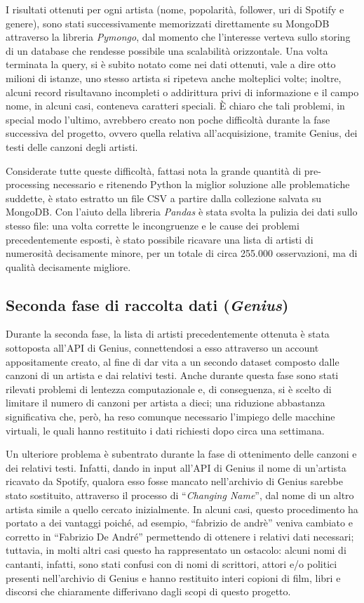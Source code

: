 \documentclass[fleqn,10pt]{SelfArx} %
\begin{document}
I risultati ottenuti per ogni artista (nome, popolarità, follower, uri di Spotify e genere), sono stati successivamente memorizzati direttamente su MongoDB attraverso la libreria \textit{Pymongo}, dal momento che l’interesse verteva sullo storing di un database che rendesse possibile una scalabilità orizzontale. Una volta terminata la query, si è subito notato come nei dati ottenuti, vale a dire otto milioni di istanze, uno stesso artista si ripeteva anche molteplici volte; inoltre, alcuni record risultavano incompleti o addirittura privi di informazione e il campo nome, in alcuni casi, conteneva caratteri speciali. È chiaro che tali problemi, in special modo l’ultimo, avrebbero creato non poche difficoltà durante la fase successiva del progetto, ovvero quella relativa all’acquisizione, tramite Genius, dei testi delle canzoni degli artisti.

Considerate tutte queste difficoltà, fattasi nota la grande quantità di pre-processing necessario e ritenendo Python la miglior soluzione alle problematiche suddette, è stato estratto un file CSV a partire dalla collezione salvata su MongoDB.
Con l’aiuto della libreria \textit{Pandas} è stata svolta la pulizia dei dati sullo stesso file: una volta corrette le incongruenze e le cause dei problemi precedentemente esposti, è stato possibile ricavare una lista di artisti di numerosità decisamente minore, per un totale di circa 255.000 osservazioni, ma di qualità decisamente migliore.

\subsection{Seconda fase di raccolta dati (\textit{Genius})}

Durante la seconda fase, la lista di artisti precedentemente ottenuta è stata sottoposta all’API di Genius, connettendosi a esso attraverso un account appositamente creato, al fine di dar vita a un secondo dataset composto dalle canzoni di un artista e dai relativi testi.
Anche durante questa fase sono stati rilevati problemi di lentezza computazionale e, di conseguenza, si è scelto di limitare il numero di canzoni per artista a dieci; una riduzione abbastanza significativa che, però, ha reso comunque necessario l’impiego delle macchine virtuali, le quali hanno restituito i dati richiesti dopo circa una settimana. 

Un ulteriore problema è subentrato durante la fase di ottenimento delle canzoni e dei relativi testi. Infatti, dando in input all’API di Genius il nome di un’artista ricavato da Spotify, qualora esso fosse mancato nell’archivio di Genius sarebbe stato sostituito, attraverso il processo di “\textit{Changing Name}”, dal nome di un altro artista simile a quello cercato inizialmente.
In alcuni casi, questo procedimento ha portato a dei vantaggi poiché, ad esempio, “fabrizio de andrè” veniva cambiato e corretto in “Fabrizio De André” permettendo di ottenere i relativi dati necessari; tuttavia, in molti altri casi questo ha rappresentato un ostacolo: alcuni nomi di cantanti, infatti, sono stati confusi con di nomi di scrittori, attori e/o politici presenti nell’archivio di Genius e hanno restituito interi copioni di film, libri e discorsi che chiaramente differivano dagli scopi di questo progetto.
\end{document}
